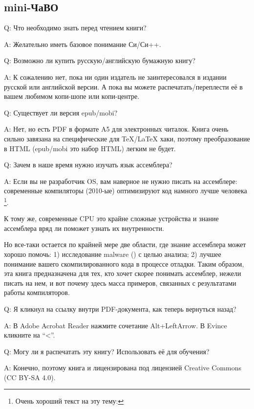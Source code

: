 \subsection*{mini-ЧаВО}

\par Q: Что необходимо знать перед чтением книги?
\par A: Желательно иметь базовое понимание Си/Си++.

\par Q: Возможно ли купить русскую/английскую бумажную книгу?
\par A: К сожалению нет, пока ни один издатель не заинтересовался в издании русской или английской версии.
А пока вы можете распечатать/переплести её в вашем любимом копи-шопе или копи-центре.

\par Q: Существует ли версия epub/mobi?
\par A: Нет, но есть PDF в формате A5 для электронных читалок.
Книга очень сильно завязана на специфические для TeX/LaTeX хаки, поэтому преобразование в HTML (epub/mobi это набор HTML)
легким не будет.

\par Q: Зачем в наше время нужно изучать язык ассемблера?
\par A: Если вы не разработчик \ac{OS}, вам наверное не нужно писать на ассемблере: современные компиляторы (2010-ые) оптимизируют код намного лучше человека
\footnote{Очень хороший текст на эту тему: \InSqBrackets{\AgnerFog}}.

К тому же, современные \ac{CPU} это крайне сложные устройства и знание ассемблера вряд ли
поможет узнать их внутренности.

Но все-таки остается по крайней мере две области, где знание ассемблера может хорошо помочь:
1) исследование malware () с целью анализа; 2) лучшее понимание
вашего скомпилированного кода в процессе отладки.
Таким образом, эта книга предназначена для тех, кто хочет скорее понимать ассемблер,
нежели писать на нем, и вот почему здесь масса примеров, связанных с результатами
работы компиляторов.

\par Q: Я кликнул на ссылку внутри PDF-документа, как теперь вернуться назад?
\par A: В Adobe Acrobat Reader нажмите сочетание Alt+LeftArrow. В Evince кликните на ``<''.

\par Q: Могу ли я распечатать эту книгу? Использовать её для обучения?
\par A: Конечно, поэтому книга и лицензирована под лицензией Creative Commons (CC BY-SA 4.0).

